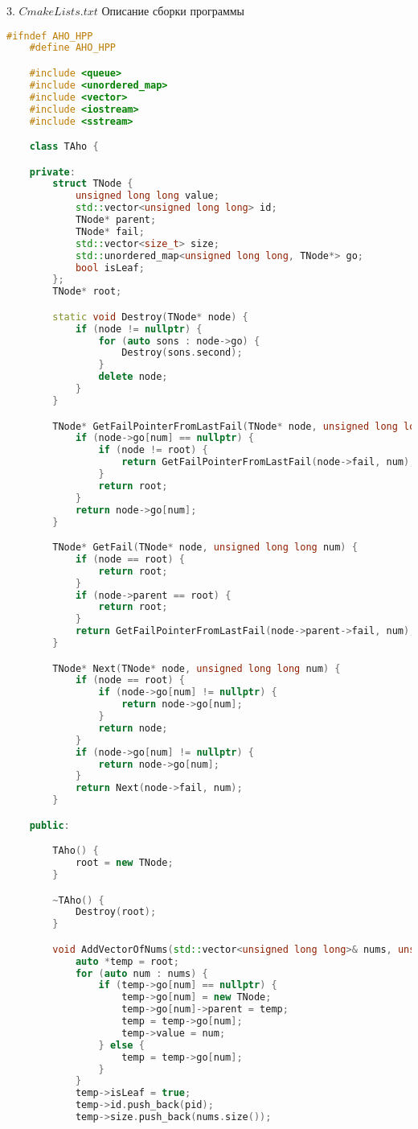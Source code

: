 3. $CmakeLists.txt$ Описание сборки программы
\begin{lstlisting}[language=C++]
    #ifndef AHO_HPP
    #define AHO_HPP

    #include <queue>
    #include <unordered_map>
    #include <vector>
    #include <iostream>
    #include <sstream>

    class TAho {

    private:
        struct TNode {
            unsigned long long value;
            std::vector<unsigned long long> id;
            TNode* parent;
            TNode* fail;
            std::vector<size_t> size;
            std::unordered_map<unsigned long long, TNode*> go;
            bool isLeaf;
        };
        TNode* root;

        static void Destroy(TNode* node) {
            if (node != nullptr) {
                for (auto sons : node->go) {
                    Destroy(sons.second);
                }
                delete node;
            }
        }

        TNode* GetFailPointerFromLastFail(TNode* node, unsigned long long num) {
            if (node->go[num] == nullptr) {
                if (node != root) {
                    return GetFailPointerFromLastFail(node->fail, num);
                }
                return root;
            }
            return node->go[num];
        }

        TNode* GetFail(TNode* node, unsigned long long num) {
            if (node == root) {
                return root;
            }
            if (node->parent == root) {
                return root;
            }
            return GetFailPointerFromLastFail(node->parent->fail, num);
        }

        TNode* Next(TNode* node, unsigned long long num) {
            if (node == root) {
                if (node->go[num] != nullptr) {
                    return node->go[num];
                }
                return node;
            }
            if (node->go[num] != nullptr) {
                return node->go[num];
            }
            return Next(node->fail, num);
        }

    public:

        TAho() {
            root = new TNode;
        }

        ~TAho() {
            Destroy(root);
        }

        void AddVectorOfNums(std::vector<unsigned long long>& nums, unsigned long long pid) {
            auto *temp = root;
            for (auto num : nums) {
                if (temp->go[num] == nullptr) {
                    temp->go[num] = new TNode;
                    temp->go[num]->parent = temp;
                    temp = temp->go[num];
                    temp->value = num;
                } else {
                    temp = temp->go[num];
                }
            }
            temp->isLeaf = true;
            temp->id.push_back(pid);
            temp->size.push_back(nums.size());


\end{lstlisting}
